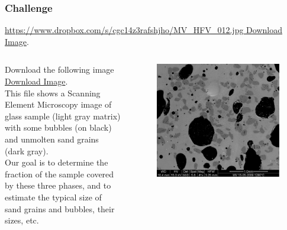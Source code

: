\documentclass[10pt,colorlinks]{beamer}
\begin{document}
\begin{frame}[fragile]\frametitle{Challenge}
 \href{https://www.dropbox.com/s/cgc14z3rafshjho/MV_HFV_012.jpg}{https://www.dropbox.com/s/cgc14z3rafshjho/MV\_HFV\_012.jpg Download Image}.
\begin{columns}[c]
Download the following image \href{https://www.dropbox.com/s/cgc14z3rafshjho/MV_HFV_012.jpg}{Download Image}. \\ 
This file shows a Scanning Element Microscopy image of  glass sample (light gray matrix) with some bubbles (on black) and unmolten sand grains (dark gray).    \\
Our goal is to determine the fraction of the sample covered by these three phases, and to estimate the typical size of sand grains and bubbles, their sizes, etc.
 
\begin{figure}[!htb]
    \centering
    \includegraphics[width=\textwidth]{figs/MV_HFV_012}
\end{figure}
\end{columns}


\end{frame}
\end{document}
